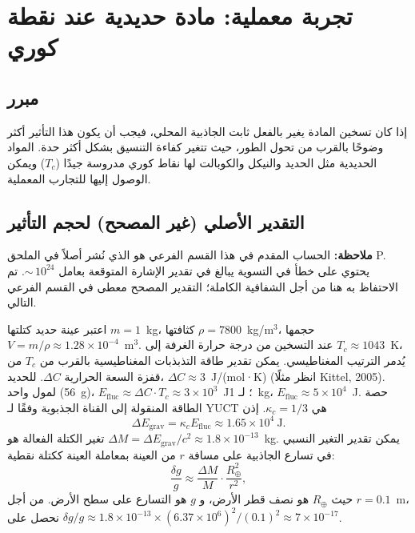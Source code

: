 \documentclass[11pt,a4paper]{article}
\begin{document}
	\section{تجربة معملية: مادة حديدية عند نقطة كوري}
	\label{sec:lab}
	
	\subsection{مبرر}
	\label{subsec:lab-rationale}
	
	إذا كان تسخين المادة يغير بالفعل ثابت الجاذبية المحلي، فيجب أن يكون هذا التأثير أكثر وضوحًا بالقرب من تحول الطور، حيث تتغير كفاءة التنسيق بشكل أكثر حدة. المواد الحديدية مثل الحديد والنيكل والكوبالت لها نقاط كوري مدروسة جيدًا ($T_c$) ويمكن الوصول إليها للتجارب المعملية.
	
	\subsection{التقدير الأصلي (غير المصحح) لحجم التأثير}
	\label{subsec:lab-estimate-uncorrected}
	
	\textbf{ملاحظة:} الحساب المقدم في هذا القسم الفرعي هو الذي نُشر أصلاً في الملحق P. يحتوي على خطأ في التسوية يبالغ في تقدير الإشارة المتوقعة بعامل ${\sim}\,10^{24}$. تم الاحتفاظ به هنا من أجل الشفافية الكاملة؛ التقدير المصحح معطى في القسم الفرعي التالي.
	
	اعتبر عينة حديد كتلتها $m = 1$~kg، كثافتها $\rho = 7800$~kg/m$^3$، حجمها $V = m/\rho \approx 1.28\times10^{-4}$~m$^3$. عند التسخين من درجة حرارة الغرفة إلى $T_c \approx 1043$~K، يُدمر الترتيب المغناطيسي. يمكن تقدير طاقة التذبذبات المغناطيسية بالقرب من $T_c$ من قفزة السعة الحرارية $\Delta C$. للحديد، $\Delta C \approx 3$~J/(mol·K) (انظر مثلًا Kittel, 2005). لمول واحد (56~g)، $E_{\text{fluc}} \approx \Delta C \cdot T_c \approx 3\times10^3$~J؛ لـ 1~kg، $E_{\text{fluc}} \approx 5\times10^4$~J. حصة الطاقة المنقولة إلى القناة الجذبوية وفقًا لـ YUCT هي $\kappa_c = 1/3$. إذن
	\begin{equation}
		\Delta E_{\text{grav}} = \kappa_c E_{\text{fluc}} \approx 1.65\times10^4\ \text{J}.
	\end{equation}
	تغير الكتلة الفعالة هو $\Delta M = \Delta E_{\text{grav}} / c^2 \approx 1.8\times10^{-13}$~kg. يمكن تقدير التغير النسبي في تسارع الجاذبية على مسافة $r$ من العينة بمعاملة العينة ككتلة نقطية:
	\begin{equation}
		\frac{\delta g}{g} \approx \frac{\Delta M}{M} \cdot \frac{R_\oplus^2}{r^2},
		\label{eq:delta-g-estimate-orig}
	\end{equation}
	حيث $R_\oplus$ هو نصف قطر الأرض، و $g$ هو التسارع على سطح الأرض. من أجل $r = 0.1$~m، نحصل على $\delta g/g \approx 1.8\times10^{-13} \times (6.37\times10^6)^2 / (0.1)^2 \approx 7\times10^{-17}$.
	
\end{document}
